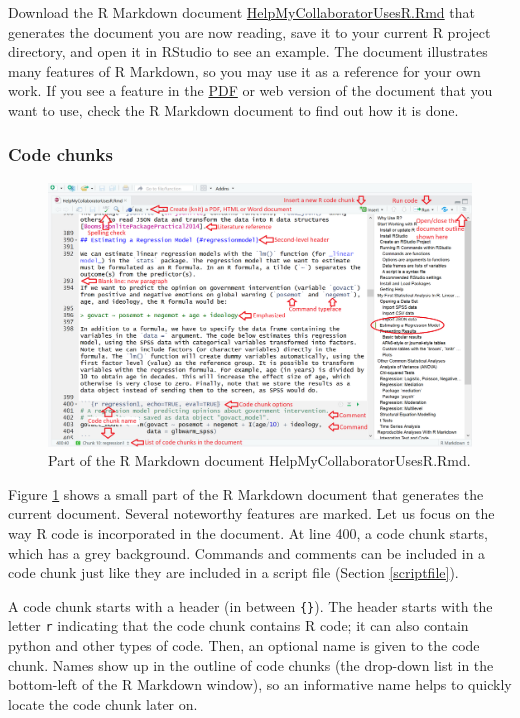 \documentclass[doc,floatsintext]{apa6}
\begin{document}
Download the R Markdown document
\href{https://wdenooy.github.io/Switch2R/HelpMyCollaboratorUsesR.Rmd}{HelpMyCollaboratorUsesR.Rmd}
that generates the document you are now reading, save it to your current
R project directory, and open it in RStudio to see an example. The
document illustrates many features of R Markdown, so you may use it as a
reference for your own work. If you see a feature in the
\href{https://wdenooy.github.io/Switch2R/HelpMyCollaboratorUsesR.pdf}{PDF}
or web version of the document that you want to use, check the R
Markdown document to find out how it is done.

\subsubsection{Code chunks}\label{code-chunks}

\begin{figure}[h]
\includegraphics[width=\linewidth]{RMarkdown} \caption{Part of the R Markdown document HelpMyCollaboratorUsesR.Rmd.}\label{fig:RMarkdown}
\end{figure}

Figure \ref{fig:RMarkdown} shows a small part of the R Markdown document
that generates the current document. Several noteworthy features are
marked. Let us focus on the way R code is incorporated in the document.
At line 400, a code chunk starts, which has a grey background. Commands
and comments can be included in a code chunk just like they are included
in a script file (Section \ref{scriptfile}).

A code chunk starts with a header (in between \texttt{\{\}}). The header
starts with the letter \texttt{r} indicating that the code chunk
contains R code; it can also contain python and other types of code.
Then, an optional name is given to the code chunk. Names show up in the
outline of code chunks (the drop-down list in the bottom-left of the R
Markdown window), so an informative name helps to quickly locate the
code chunk later on.
\end{document}
